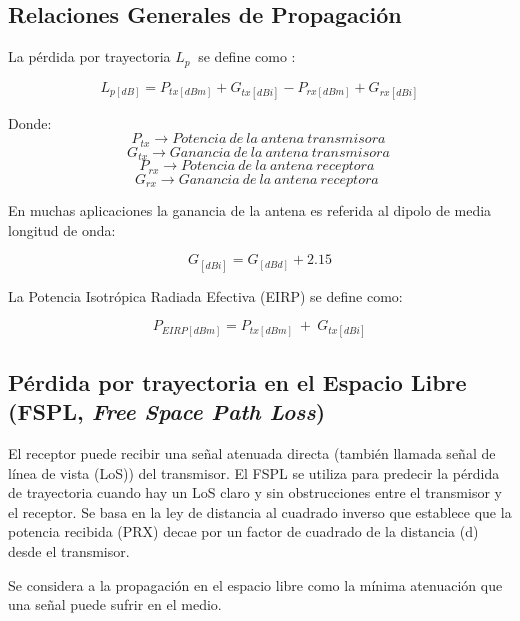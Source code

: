 \subsection{Relaciones Generales de Propagación}

La pérdida por trayectoria $L_p\ $ se define como \parencite{Correia2018}:

\begin{equation}
L_{p[dB]}=P_{tx[dBm]}+G_{tx[dBi]}-P_{rx\left[dBm\right]}+G_{rx\left[dBi\right]}
\label{eqn:Lp}
\end{equation}

Donde:\newline
\[P_{tx}\to Potencia\ de\ la\ antena\ transmisora\ \] 
\[G_{tx}\to Ganancia\ de\ la\ antena\ transmisora\ \] 
\[P_{rx}\to Potencia\ de\ la\ antena\ receptora\ \ \] 
\[G_{rx}\to Ganancia\ de\ la\ antena\ receptora\ \ \] 

En muchas aplicaciones la ganancia de la antena es referida al dipolo de media longitud de onda:\newline

\begin{equation}
G_{[dBi]} = G_{[dBd]}+{2.15} 
\label{eqn:Gain}
\end{equation}

La Potencia Isotrópica Radiada Efectiva (EIRP) se define como:

\begin{equation}
P_{EIRP[dBm]}=P_{tx\left[dBm\right]}{\ +\ G}_{tx[dBi]}
\label{eqn:EIRP}
\end{equation}

\subsection{Pérdida por trayectoria en el Espacio Libre (FSPL, \textit{Free Space Path Loss})}

El receptor puede recibir una señal atenuada directa (también llamada señal de línea de vista (LoS)) del transmisor. El FSPL se utiliza para predecir la pérdida de trayectoria cuando hay un LoS claro y sin obstrucciones entre el transmisor y el receptor. Se basa en la ley de distancia al cuadrado inverso que establece que la potencia recibida (PRX) decae por un factor de cuadrado de la distancia (d) desde el transmisor.\newline

Se considera a la propagación en el espacio libre como la mínima atenuación que una señal puede sufrir en el medio.\newline

